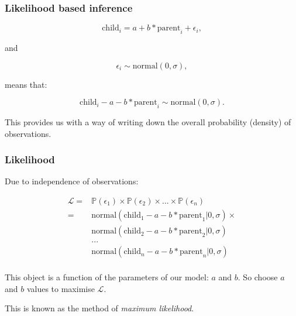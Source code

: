 \documentclass[handout]{beamer}
\begin{document}
\begin{frame}
	\frametitle{Likelihood based inference}
	
	\begin{equation}
	\text{child}_i = a + b * \text{parent}_i + \epsilon_i,
	\end{equation}
	
	and
	
	\begin{equation}
	\epsilon_i \sim \text{normal}(0, \sigma),
	\end{equation}
	
	means that:
	
	\begin{equation}
	\text{child}_i - a - b * \text{parent}_i\sim \text{normal}(0, \sigma).
	\end{equation}
	
	This provides us with a way of writing down the overall probability (density) of observations.
	
\end{frame}

\begin{frame}
	\frametitle{Likelihood}
	
	Due to independence of observations:
	
	\begin{align}
	\mathcal{L} = &\mathbb{P}(\epsilon_1) \times \mathbb{P}(\epsilon_2) \times ... \times  \mathbb{P}(\epsilon_n)\\
	= &\text{normal}(\text{child}_1 - a - b * \text{parent}_1|0, \sigma) \times\\
	&\text{normal}(\text{child}_2 - a - b * \text{parent}_2|0, \sigma)\\
	&...\\
	&\text{normal}(\text{child}_n - a - b * \text{parent}_n|0, \sigma)\\
	\end{align}
	
	This object is a function of the parameters of our model: $a$ and $b$. So choose $a$ and $b$ values to maximise $\mathcal{L}$.
	
	\vspace{0.5cm}
	
	This is known as the method of \textit{maximum likelihood}.
	
\end{frame}
\end{document}
